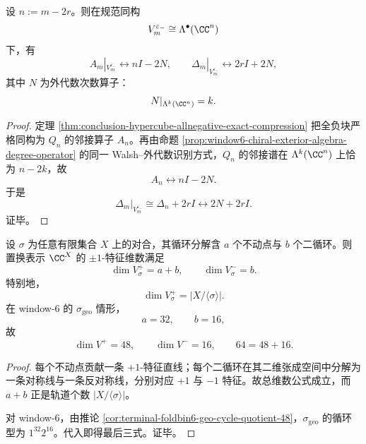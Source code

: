 \begin{proposition}[全负手征塔的外代数正规形]\label{prop:conclusion-hypercube-allnegative-exterior-normal-form}
设 \(n:=m-2r\)。则在规范同构
\[
V_m^{\varepsilon_-}\cong \Lambda^\bullet(\CC^n)
\]
下，有
\[
A_m|_{V_m^{\varepsilon_-}}
\longleftrightarrow
nI-2N,
\qquad
\Delta_m|_{V_m^{\varepsilon_-}}
\longleftrightarrow
2rI+2N,
\]
其中 \(N\) 为外代数次数算子：
\[
N|_{\Lambda^k(\CC^n)}=k.
\]
\end{proposition}
\begin{proof}
定理 \ref{thm:conclusion-hypercube-allnegative-exact-compression} 把全负块严格同构为 \(Q_n\) 的邻接算子 \(A_n\)。再由命题 \ref{prop:window6-chiral-exterior-algebra-degree-operator} 的同一 Walsh--外代数识别方式，\(Q_n\) 的邻接谱在 \(\Lambda^k(\CC^n)\) 上恰为 \(n-2k\)，故
\[
A_n\longleftrightarrow nI-2N.
\]
于是
\[
\Delta_m|_{V_m^{\varepsilon_-}}
\cong
\Delta_n+2rI
\longleftrightarrow
2N+2rI.
\]
证毕。
\end{proof}

\begin{theorem}[轨道可见维与手征亏维的精确平衡]\label{thm:conclusion-involution-visible-chiral-dimension-balance}
设 \(\sigma\) 为任意有限集合 \(X\) 上的对合，其循环分解含 \(a\) 个不动点与 \(b\) 个二循环。则置换表示 \(\CC^X\) 的 \(\pm1\)-特征维数满足
\[
\dim V_\sigma^+=a+b,
\qquad
\dim V_\sigma^-=b.
\]
特别地，
\[
\dim V_\sigma^+=|X/\langle \sigma\rangle|.
\]
在 window-\(6\) 的 \(\sigma_{\mathrm{geo}}\) 情形，
\[
a=32,
\qquad
b=16,
\]
故
\[
\dim V^+=48,
\qquad
\dim V^-=16,
\qquad
64=48+16.
\]
\end{theorem}
\begin{proof}
每个不动点贡献一条 \(+1\)-特征直线；每个二循环在其二维张成空间中分解为一条对称线与一条反对称线，分别对应 \(+1\) 与 \(-1\) 特征。故总维数公式成立，而 \(a+b\) 正是轨道个数 \(|X/\langle\sigma\rangle|\)。

对 window-\(6\)，由推论 \ref{cor:terminal-foldbin6-geo-cycle-quotient-48}，\(\sigma_{\mathrm{geo}}\) 的循环型为 \(1^{32}2^{16}\)。代入即得最后三式。证毕。
\end{proof}

